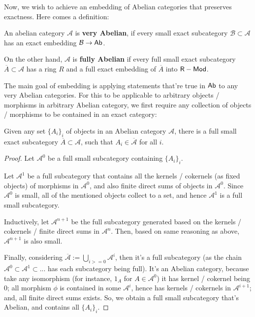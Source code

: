 \documentclass{article}
\begin{document}
\hfil

Now, we wish to achieve an embedding of Abelian categories that preserves exactness. Here comes a definition:
\begin{defn}
    An abelian category $\mathcal{A}$ is \textbf{very Abelian}, if every small exact subcategory $\mathcal{B}\subset \mathcal{A}$ has an exact embedding $\mathcal{B}\rightarrow \mathsf{Ab}$.

    On the other hand, $\mathcal{A}$ is \textbf{fully Abelian} if every full small exact subcategory $\overline{A}\subset \mathcal{A}$ has a ring $R$ and a full exact embedding of $\overline{A}$ into $\mathsf{R-Mod}$.
\end{defn}

The main goal of embedding is applying statements that're true in $\mathsf{Ab}$ to any very Abelian categories. For this to be applicable to arbitrary objects / morphisms in arbitrary Abelian category, we first require any collection of objects / morphisms to be contained in an exact category:
\begin{prop}
    Given any set $\{A_i\}_i$ of objects in an Abelian category $\mathcal{A}$, there is a full small exact subcategory $\overline{A}\subset \mathcal{A}$, such that $A_i \in \overline{\mathcal{A}}$ for all $i$.
\end{prop}
\begin{proof}
    Let $\mathcal{A}^0$ be a full small subcategory containing $\{A_i\}_i$. 
    
    Let $\mathcal{A}^1$ be a full subcategory that contains all the kernels / cokernels (as fixed objects) of morphisms in $\mathcal{A}^0$, and also finite direct sums of objects in $\mathcal{A}^0$. Since $\mathcal{A}^0$ is small, all of the mentioned objects collect to a set, and hence $\mathcal{A}^1$ is a full small subcategory.

    Inductively, let $\mathcal{A}^{n+1}$ be the full subcategory generated based on the kernels / cokernels / finite direct sums in $\mathcal{A}^n$. Then, based on same reasoning as above, $\mathcal{A}^{n+1}$ is also small.

    Finally, considering $\overline{\mathcal{A}}:=\bigcup_{i>=0}\mathcal{A}^i$, then it's a full subcategory (as the chain $\mathcal{A}^0 \subset \mathcal{A}^1 \subset ...$ has each subcategory being full). It's an Abelian category, because take any isomorphism (for instance, $1_A$ for $A\in\mathcal{A}^0$) it has kernel / cokernel being $0$; all morphism $\phi$ is contained in some $\mathcal{A}^i$, hence has kernels / cokernels in $\mathcal{A}^{i+1}$; and, all finite direct sums exists. So, we obtain a full small subcategory that's Abelian, and contains all $\{A_i\}_i$.
\end{proof}
\end{document}

